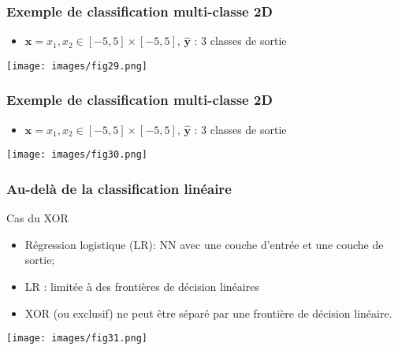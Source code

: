 \documentclass[9pt]{beamer}
\newcommand \ve[1]{\mathbf{#1}}
\begin{document}
\begin{frame}
\frametitle{Exemple de classification multi-classe 2D}
\begin{itemize}
\item $\ve{x} ={x_1,x_2} \in [-5,5]\times [-5,5]$, $\ve{\hat{y}}$ : 3 classes de sortie 
\end{itemize}
\begin{center}
\texttt{[image: images/fig29.png]}
\end{center}
\end{frame}

\begin{frame}
\frametitle{Exemple de classification multi-classe 2D}
\begin{itemize}
\item $\ve{x} ={x_1,x_2} \in [-5,5]\times [-5,5]$, $\ve{\hat{y}}$ : 3 classes de sortie 
\end{itemize}
\begin{center}
\texttt{[image: images/fig30.png]}
\end{center}
\end{frame}

\begin{frame}
\frametitle{Au-delà de la classification linéaire}
\begin{alertblock}{Cas du XOR}
\begin{itemize}
\item Régression logistique (LR): NN avec une couche d'entrée et une couche de sortie;
\item LR : limitée à des frontières de décision linéaires
\item XOR (ou exclusif) ne peut être séparé par une frontière de décision linéaire.
\end{itemize}
\begin{center}
\texttt{[image: images/fig31.png]}
\end{center}
\end{alertblock}
\end{frame}
\end{document}
